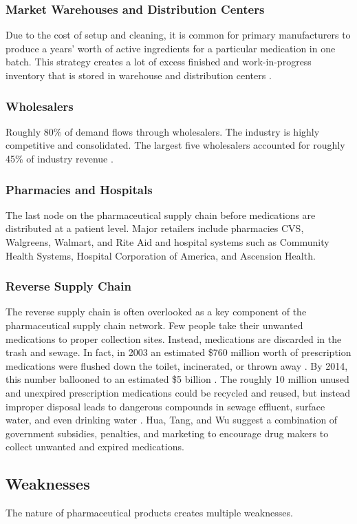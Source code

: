 \documentclass[sigconf]{acmart}
\begin{document}
\subsubsection{Market Warehouses and Distribution Centers} Due to the cost of setup and cleaning, it is common for primary manufacturers to produce a years' worth of active ingredients for a particular medication in one batch. This strategy creates a lot of excess finished and work-in-progress inventory that is stored in warehouse and distribution centers \cite{Shah01}.
\subsubsection{Wholesalers} Roughly 80\% of demand flows through wholesalers. The industry is highly competitive and consolidated. The largest five wholesalers accounted for roughly 45\% of industry revenue \cite{Shah01} \cite{Hoovers01}.
\subsubsection{Pharmacies and Hospitals} The last node on the pharmaceutical supply chain before medications are distributed at a patient level. Major retailers include pharmacies CVS, Walgreens, Walmart, and Rite Aid and hospital systems such as Community Health Systems, Hospital Corporation of America, and Ascension Health. 
\subsubsection{Reverse Supply Chain} The reverse supply chain is often overlooked as a key component of the pharmaceutical supply chain network. Few people take their unwanted medications to proper collection sites. Instead, medications are discarded in the trash and sewage. In fact, in 2003 an estimated \$760 million worth of prescription medications were flushed down the toilet, incinerated, or thrown away \cite{Hua01}. By 2014, this number ballooned to an estimated \$5 billion \cite{Lenzerg01}. The roughly 10 million unused and unexpired prescription medications could be recycled and reused, but instead improper disposal leads to dangerous compounds in sewage effluent, surface water, and even drinking water \cite{Hua01} \cite{Lenzerg01}.  Hua, Tang, and Wu \cite{Hua01} suggest a combination of government subsidies, penalties, and marketing to encourage drug makers to collect unwanted and expired medications. 

\subsection{Weaknesses}
The nature of pharmaceutical products creates multiple weaknesses. 
\end{document}
